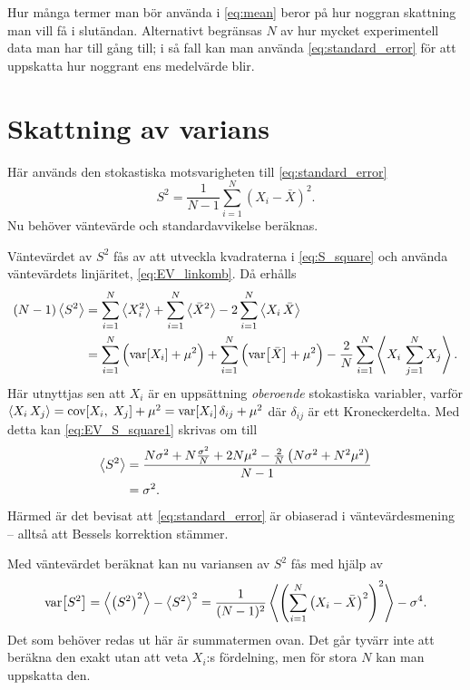 Hur många termer man bör använda i \eqref{eq:mean} beror på hur noggran skattning man vill få i slutändan. Alternativt begränsas $N$ av hur mycket experimentell data man har till gång till; i så fall kan man använda \eqref{eq:standard_error} för att uppskatta hur noggrant ens medelvärde blir. 


\section{Skattning av varians}
Här används den stokastiska motsvarigheten till \eqref{eq:standard_error}
\begin{equation}\label{eq:S_square}
S^2 = \frac{1}{N-1} \sum_{i=1}^N \left(X_i-\bar{X} \right)^2.
\end{equation}
Nu behöver väntevärde och standardavvikelse beräknas. 

Väntevärdet av $S^2$ fås av att utveckla kvadraterna i \eqref{eq:S_square} och använda väntevärdets linjäritet, \eqref{eq:EV_linkomb}. Då erhålls
\begin{equation}\label{eq:EV_S_square1}
\begin{aligned}
(N-1)\ev{S^2} &=  \sum_{i=1}^N \ev{X_i^2} 
+ \sum_{i=1}^N\ev{\bar{X}^2} 
- 2\sum_{i=1}^N\ev{X_i\,\bar{X}}\\
&= 
\sum_{i=1}^N \Big( \VAR{X_i}+\mu^2 \Big)
+\sum_{i=1}^N\Big( \VAR{\bar{X}}+\mu^2 \Big)
-\frac{2}{N}\sum_{i=1}^N\ev{X_i\,\sum_{j=1}^N X_j}.
\end{aligned}
\end{equation}
Här utnyttjas sen att $X_i$ är en uppsättning \emph{oberoende} stokastiska variabler, varför $\ev{X_i\,X_j}=\COV{X_i}{X_j}+\mu^2=\VAR{X_i}\delta_{ij}+\mu^2$ där $\delta_{ij}$ är ett Kroneckerdelta. Med detta kan \eqref{eq:EV_S_square1} skrivas om till
\begin{equation}\label{eq:EV_S_square2}
\begin{aligned}
\ev{S^2} &= \frac{
N\sigma^2 + N\frac{\sigma^2}{N} + 2N\mu^2
-\frac{2}{N} \left( N\sigma^2 + N^2\mu^2 \right)
}{N-1} \\
&= \sigma^2.
\end{aligned}
\end{equation}
Härmed är det bevisat att \eqref{eq:standard_error} är obiaserad i väntevärdesmening -- alltså att Bessels korrektion stämmer.


Med väntevärdet beräknat kan nu variansen av $S^2$ fås med hjälp av 
\begin{equation}\label{eq:VAR_S_square}
\VAR{S^2} = \ev{\left(S^2\right)^2} - \ev{S^2}^2
= \frac{1}{(N-1)^2}\ev{\left(\sum_{i=1}^N\left(X_i-\bar{X}\right)^2 \right)^2} - \sigma^4.
\end{equation}
Det som behöver redas ut här är summatermen ovan. 
Det går tyvärr inte att beräkna den exakt utan att veta $X_i$:s fördelning, men för stora $N$ kan man uppskatta den. 


